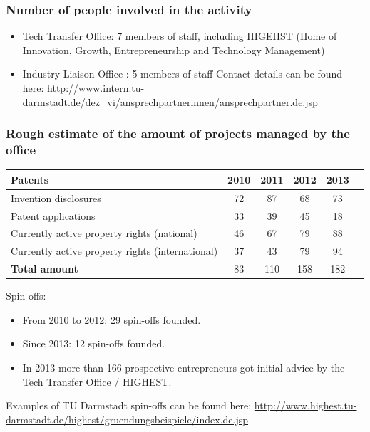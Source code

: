 \documentclass[12pt,a4paper,twoside]{article}
\begin{document}
\subsubsection{Number of people involved in the activity}
\begin{itemize}
\item Tech Transfer Office: 7 members of staff, including HIGEHST (Home of Innovation, Growth, Entrepreneurship and Technology Management)
\item Industry Liaison Office : 5 members of staff
Contact details can be found here: 
\url{http://www.intern.tu-darmstadt.de/dez_vi/ansprechpartnerinnen/ansprechpartner.de.jsp}
\end{itemize}

\subsubsection{Rough estimate of the amount of projects managed by the office}
\begin{center}
\begin{tabular}{| l | c | c | c | c | r | }
\hline
Patents & 2010 & 2011 & 2012 & 2013 \\
\hline
Invention disclosures & 72 & 87 & 68 & 73\\
Patent applications & 33 & 39 & 45 & 18\\ 	 	 	 	 
Currently active property rights (national) & 46 & 67 & 79 & 88\\
Currently active property rights (international)& 37 & 43 & 79 & 94\\
\hline
\bf{Total amount} & 83 & 110 & 158 & 182 \\
\hline
\end{tabular}
\end{center}

Spin-offs:
\begin{itemize}
\item From 2010 to 2012: 29 spin-offs founded.
\item Since 2013: 12 spin-offs founded.
\item In 2013 more than 166 prospective entrepreneurs got initial advice by the Tech Transfer Office / HIGHEST.
\end{itemize}

Examples of TU Darmstadt spin-offs can be found here: 
\url{http://www.highest.tu-darmstadt.de/highest/gruendungsbeispiele/index.de.jsp}

 
\end{document}
